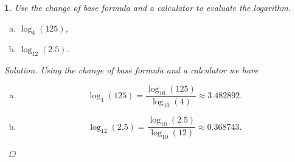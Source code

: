 \documentclass[12pt]{amsart}
\newtheorem{thm}{}
\begin{document}
\setcounter{thm}{35} 
\begin{thm}
  Use the change of base formula and a calculator to evaluate the logarithm.
  \begin{enumerate}[(a)]
  \item
    $\log_4(125)$,
  \item
    $\log_{12}(2.5)$.
  \end{enumerate}

  \begin{proof}[Solution]
    Using the change of base formula and a calculator we have
    \begin{enumerate}[(a)]
    \item
      $$\log_4(125) = \frac{\log_{10}(125)}{\log_{10}(4)} \approx 3.482892.$$
    \item
      $$\log_{12}(2.5) = \frac{\log_{10}(2.5)}{\log_{10}(12)} \approx 0.368743.$$
    \end{enumerate}
  \end{proof}
\end{thm}
\end{document}
